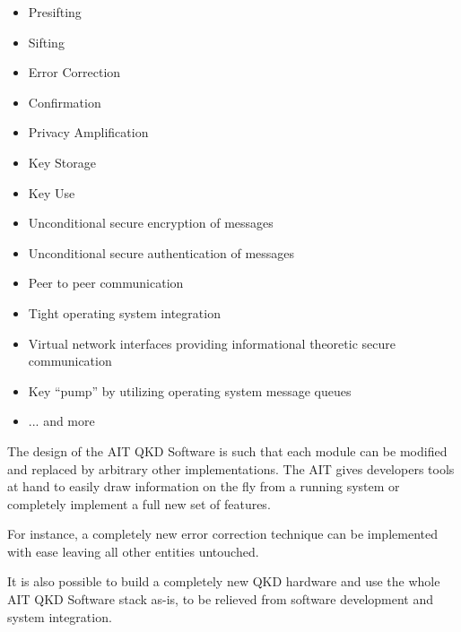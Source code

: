 \begin{itemize}

    \item Presifting

    \item Sifting

    \item Error Correction

    \item Confirmation

    \item Privacy Amplification

    \item Key Storage

    \item Key Use

    \item Unconditional secure encryption of messages

    \item Unconditional secure authentication of messages

    \item Peer to peer communication

    \item Tight operating system integration

    \item Virtual network interfaces providing informational theoretic secure communication

    \item Key ``pump'' by utilizing operating system message queues
    
    \item ... and more

\end{itemize}


\medskip

The design of the AIT QKD Software is such that each module can be modified and replaced by arbitrary other implementations. The AIT gives developers tools at hand to easily draw information on the fly from a running system or completely implement a full new set of features.

\medskip

For instance, a completely new error correction technique can be implemented with ease leaving all other entities untouched.

\medskip

It is also possible to build a completely new QKD hardware and use the whole AIT QKD Software stack as-is, to be relieved from software development and system integration.

